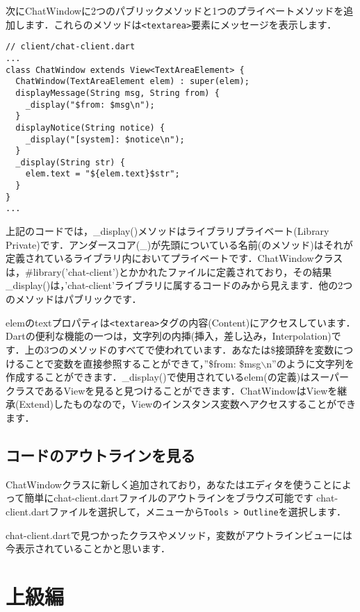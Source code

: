 次にChatWindowに2つのパブリックメソッドと1つのプライベートメソッドを追加します．これらのメソッドは\verb|<textarea>|要素にメッセージを表示します．

\begin{verbatim}
// client/chat-client.dart
...
class ChatWindow extends View<TextAreaElement> {
  ChatWindow(TextAreaElement elem) : super(elem);
  displayMessage(String msg, String from) {
    _display("$from: $msg\n");
  }
  displayNotice(String notice) {
    _display("[system]: $notice\n");
  }
  _display(String str) {
    elem.text = "${elem.text}$str";
  }
}
...
\end{verbatim}

上記のコードでは，\_display()メソッドはライブラリプライベート(Library Private)です．アンダースコア(\_)が先頭についている名前(のメソッド)はそれが定義されているライブラリ内においてプライベートです．ChatWindowクラスは，\#library('chat-client')とかかれたファイルに定義されており，その結果\_display()は，'chat-client'ライブラリに属するコードのみから見えます．他の2つのメソッドはパブリックです．

elemのtextプロパティは\verb|<textarea>|タグの内容(Content)にアクセスしています．Dartの便利な機能の一つは，文字列の内挿(挿入，差し込み，Interpolation)です．上の3つのメソッドのすべてで使われています．あなたは\$接頭辞を変数につけることで変数を直接参照することができて，''\$from: \$msg$\backslash$n''のように文字列を作成することができます．\_display()で使用されているelem(の定義)はスーパークラスであるViewを見ると見つけることができます．ChatWindowはViewを継承(Extend)したものなので，Viewのインスタンス変数へアクセスすることができます．

\subsection{コードのアウトラインを見る}

ChatWindowクラスに新しく追加されており，あなたはエディタを使うことによって簡単にchat-client.dartファイルのアウトラインをブラウズ可能です
chat-client.dartファイルを選択して，メニューから\verb|Tools > Outline|を選択します．


chat-client.dartで見つかったクラスやメソッド，変数がアウトラインビューには今表示されていることかと思います．


\section{上級編}

